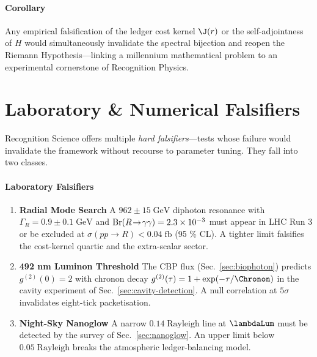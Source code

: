 \documentclass[11pt,oneside]{book}
\begin{document}
{\paragraph*{Corollary}
Any empirical falsification of the ledger cost kernel $\J(r)$ or the
self-adjointness of $H$ would simultaneously invalidate the spectral
bijection and reopen the Riemann Hypothesis—linking a millennium
mathematical problem to an experimental cornerstone of Recognition
Physics.


\section{Laboratory \& Numerical Falsifiers}
\label{sec:falsifiers}

Recognition Science offers multiple \emph{hard falsifiers}—tests
whose failure would invalidate the framework without recourse to
parameter tuning.  They fall into two classes.

\paragraph{Laboratory Falsifiers}

\begin{enumerate}\setlength\itemsep{6pt}

\item \textbf{Radial Mode Search}  
      A $962\pm15\;\text{GeV}$ diphoton resonance with
      $\Gamma_{R}=0.9\pm0.1\;\text{GeV}$ and
      ${\rm Br}(R\!\to\!\gamma\gamma)=2.3\times10^{-3}$
      must appear in LHC Run 3 or be excluded at
      $\sigma(pp\!\to\!R)<0.04\;\text{fb}$ (95 \% CL).
      A tighter limit falsifies the cost-kernel quartic
      and the extra-scalar sector.

\item \textbf{492 nm Luminon Threshold}  
      The CBP flux (Sec.~\ref{sec:biophoton}) predicts
      $g^{(2)}(0)=2$ with chronon decay
      $g^{(2)}(\tau)=1+\exp(-\tau/\Chronon)$
      in the cavity experiment of
      Sec.~\ref{sec:cavity-detection}.
      A null correlation at $5\sigma$ invalidates
      eight-tick packetisation.

\item \textbf{Night-Sky Nanoglow}  
      A narrow $0.14\;\text{Rayleigh}$ line at
      $\lambdaLum$ must be detected by the survey
      of Sec.~\ref{sec:nanoglow}.
      An upper limit below $0.05\;\text{Rayleigh}$ breaks the
      atmospheric ledger-balancing model.


\end{enumerate}}
\end{document}
